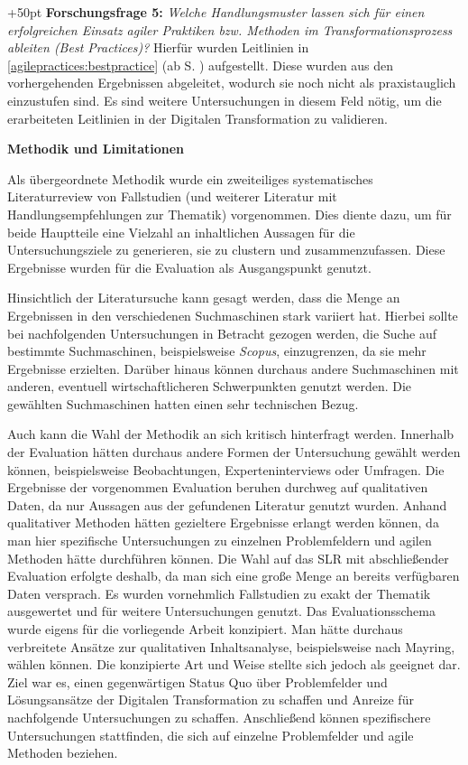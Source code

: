 \hangindent+50pt 
\textbf{Forschungsfrage 5:} \textit{Welche Handlungsmuster lassen sich für einen erfolgreichen Einsatz agiler Praktiken bzw. Methoden im Transformationsprozess ableiten (Best Practices)?}  Hierfür wurden Leitlinien in \ref{agilepractices:bestpractice} (ab S. \pageref{agilepractices:bestpractice}) aufgestellt. Diese wurden aus den vorhergehenden Ergebnissen abgeleitet, wodurch sie noch nicht als praxistauglich einzustufen sind. Es sind weitere Untersuchungen in diesem Feld nötig, um die erarbeiteten Leitlinien in der Digitalen Transformation zu validieren.

\clearpage

\textbf{Methodik und Limitationen} 

Als übergeordnete Methodik wurde ein zweiteiliges systematisches Literaturreview von Fallstudien (und weiterer Literatur mit Handlungsempfehlungen zur Thematik) vorgenommen. Dies diente dazu, um für beide Hauptteile eine Vielzahl an inhaltlichen Aussagen für die Untersuchungsziele zu generieren, sie zu clustern und zusammenzufassen. Diese Ergebnisse wurden für die Evaluation als Ausgangspunkt genutzt. 

Hinsichtlich der Literatursuche kann gesagt werden, dass die Menge an Ergebnissen in den verschiedenen Suchmaschinen stark variiert hat. Hierbei sollte bei nachfolgenden Untersuchungen in Betracht gezogen werden, die Suche auf bestimmte Suchmaschinen, beispielsweise \textit{Scopus}, einzugrenzen, da sie mehr Ergebnisse erzielten. Darüber hinaus können durchaus andere Suchmaschinen mit anderen, eventuell wirtschaftlicheren Schwerpunkten genutzt werden. Die gewählten Suchmaschinen hatten einen sehr technischen Bezug.

Auch kann die Wahl der Methodik an sich kritisch hinterfragt werden. Innerhalb der Evaluation hätten durchaus andere Formen der Untersuchung gewählt werden können, beispielsweise Beobachtungen, Experteninterviews oder Umfragen. Die Ergebnisse der vorgenommen Evaluation beruhen durchweg auf qualitativen Daten, da nur Aussagen aus der gefundenen Literatur genutzt wurden. Anhand qualitativer Methoden hätten gezieltere Ergebnisse erlangt werden können, da man hier spezifische Untersuchungen zu einzelnen Problemfeldern und agilen Methoden hätte durchführen können. Die Wahl auf das SLR mit abschließender Evaluation erfolgte deshalb, da man sich eine große Menge an bereits verfügbaren Daten versprach. Es wurden vornehmlich Fallstudien zu exakt der Thematik ausgewertet und für weitere Untersuchungen genutzt. Das Evaluationsschema wurde eigens für die vorliegende Arbeit konzipiert. Man hätte durchaus verbreitete Ansätze zur qualitativen Inhaltsanalyse, beispielsweise nach Mayring, wählen können. Die konzipierte Art und Weise stellte sich jedoch als geeignet dar. Ziel war es, einen gegenwärtigen Status Quo über Problemfelder und Lösungsansätze der Digitalen Transformation zu schaffen und Anreize für nachfolgende Untersuchungen zu schaffen. Anschließend können spezifischere Untersuchungen stattfinden, die sich auf einzelne Problemfelder und agile Methoden beziehen. 

